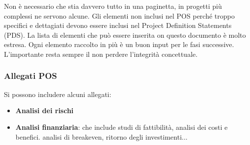 \noindent Non è necessario che stia davvero tutto in una paginetta, in progetti più complessi ne servono alcune. Gli elementi non inclusi nel POS perché troppo specifici e dettagiati devono essere inclusi nel Project Definition Statements (PDS). La lista di elementi che può essere inserita on questo documento è molto estresa. Ogni elemento raccolto in più è un buon input per le fasi successive. L'importante resta sempre il non perdere l'integrità concettuale.
\subsubsection{Allegati POS}
Si possono includere alcuni allegati:
\begin{itemize}
	\item \textbf{Analisi dei rischi}
	\item \textbf{Analisi finanziaria}: che include studi di fattibilità, analisi dei costi e benefici. analisi di breakeven, ritorno degli investimenti...
\end{itemize}

